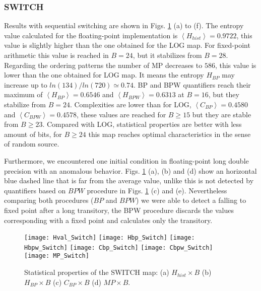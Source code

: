 \subsubsection{SWITCH} \label{sssec:switch}

Results with sequential switching are shown in Figs. \ref{fig:SWITCH_QuantiB} (a) to (f).
The entropy value calculated for the floating-point implementation is $\left\langle H_{hist}\right\rangle =0.9722$, this value is slightly higher than the one obtained for the LOG map. 
For fixed-point arithmetic this value is reached in $B=24$, but it stabilizes from $B=28$.
Regarding the ordering patterns the number of MP decreases to $586$, this value is lower than the one obtained for LOG map.
It means the entropy $H_{BP}$ may increase up to $ln(134)/ln(720)\simeq 0.74$.
BP and BPW quantifiers reach their maximum of $\left\langle H_{BP}\right\rangle =0.6546$ and $\left\langle H_{BPW}\right\rangle =0.6313$ at $B=16$, but they stabilize from $B=24$.
Complexities are lower than for LOG, $\left\langle C_{BP}\right\rangle =0.4580$ and $\left\langle C_{BPW}\right\rangle =0.4578$, these values are reached for $B \geq 15$ but they are stable from $B \geq 23$.
Compared with LOG, statistical properties are better with less amount of bits, for $B \geq 24$ this map reaches optimal characteristics in the sense of random source.

Furthermore, we encountered one initial condition in floating-point long double precision with an anomalous behavior.
Figs. \ref{fig:SWITCH_QuantiB} (a), (b) and (d) show an horizontal blue dashed line that is far from the average value, unlike this is not detected by quantifiers based on $BPW$ procedure in Figs. \ref{fig:SWITCH_QuantiB} (c) and (e).
Nevertheless comparing both procedures ($BP$ and $BPW$) we were able to detect a falling to fixed point after a long transitory, the BPW procedure discards the values corresponding with a fixed point and calculates only the transitory.

\begin{figure}
	\texttt{[image: Hval\_Switch]}
	\texttt{[image: Hbp\_Switch]}
	\texttt{[image: Hbpw\_Switch]}
	\texttt{[image: Cbp\_Switch]}
	\texttt{[image: Cbpw\_Switch]}
	\texttt{[image: MP\_Switch]}
	\caption{Statistical properties of the SWITCH map: (a) $H_{hist} \times B$ (b) $H_{BP} \times B$ (c) $C_{BP} \times B$ (d) $MP \times B$.}
	\label{fig:SWITCH_QuantiB}
\end{figure}

